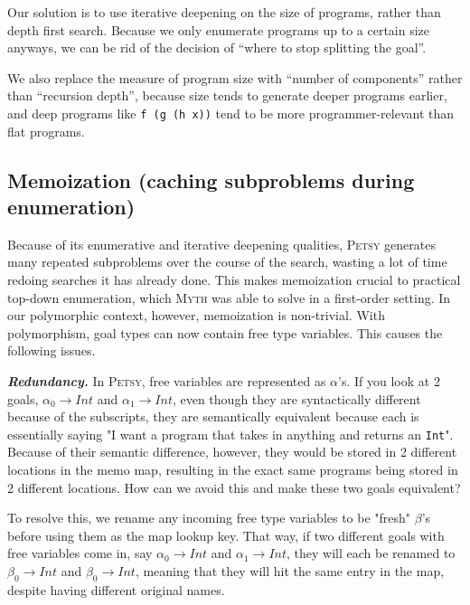 \documentclass[acmsmall,nonacm]{acmart}
\begin{document}
Our solution is to use iterative deepening on the size of programs, 
rather than depth first search. Because we only enumerate programs up 
to a certain size anyways, we can be rid of the decision of ``where to 
stop splitting the goal''.

We also replace the measure of program size with ``number of components'' 
rather than ``recursion depth'', because size tends to generate deeper 
programs earlier, and deep programs like \texttt{f (g (h x))} tend to 
be more programmer-relevant than flat programs.



\subsection{Memoization (caching subproblems during enumeration)}

Because of its enumerative and iterative deepening qualities, \textsc{Petsy} 
generates many repeated subproblems
over the course of the search, wasting a lot of time redoing searches it has
already done. This makes memoization crucial to practical 
top-down enumeration, which \textsc{Myth} \cite{myth} was able to solve in a 
first-order setting.
In our polymorphic context, however, memoization is non-trivial. 
With polymorphism, goal types can now contain free 
type variables. This causes the following issues.

\vspace{2mm}
\noindent \textbf{\textit{Redundancy.}} In \textsc{Petsy}, free variables 
are represented as $\alpha$'s. If you look at 2 goals, $\alpha_0 \to Int$ 
and $\alpha_1 \to Int$, even though they are syntactically different because of the subscripts,
they are semantically equivalent because each is essentially saying "I want 
a program that takes in anything and returns an \texttt{Int}". Because 
of their semantic difference, however, they would be stored in 2 different 
locations in the memo map, resulting in the exact same programs being stored
in 2 different locations. 
How can we avoid this and make these two goals equivalent?

To resolve this, we rename any incoming free type variables 
to be "fresh" $\beta$'s before using them as the map lookup key. That way, if 
two different goals with free variables come in, say $\alpha_0 \to Int$ and 
$\alpha_1 \to Int$, they will each be renamed to $\beta_0 \to Int$ 
and $\beta_0 \to Int$, meaning that they will hit the same entry in the map,
despite having different original names.
\end{document}
